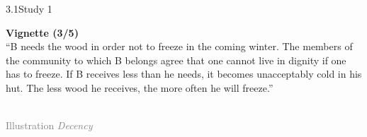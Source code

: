 \documentclass[xcolor=table,9pt,aspectratio=169]{beamer}
\begin{document}
\begin{frame}{\vspace*{10mm}3.1\hspace*{1em}Study 1}
\begin{multicols}{2}
   \textbf{Vignette (3/5)}\\
   \medskip
   \enquote{B needs the wood in order not to freeze in the coming winter.
   The members of the community to which B belongs agree that one cannot live in dignity if one has to freeze.
   If B receives less than he needs, it becomes unacceptably cold in his hut.
   The less wood he receives, the more often he will freeze.}
   \vfill
   \begin{center}
      \\
      \textcolor{gray}{Illustration \textit{Decency}}
   \end{center}
\end{multicols}
\end{frame}
\end{document}
